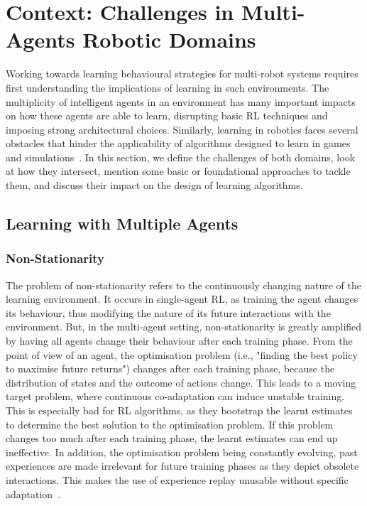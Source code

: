 
\section{Context: Challenges in Multi-Agents Robotic Domains}\label{sec:MADRL_Context}

Working towards learning behavioural strategies for multi-robot systems requires first understanding the implications of learning in such environments. The multiplicity of intelligent agents in an environment has many important impacts on how these agents are able to learn, disrupting basic RL techniques and imposing strong architectural choices. Similarly, learning in robotics faces several obstacles that hinder the applicability of algorithms designed to learn in games and simulations~\citep{Pierson2017_DRLinRobots}. In this section, we define the challenges of both domains, look at how they intersect, mention some basic or foundational approaches to tackle them, and discuss their impact on the design of learning algorithms. 



\subsection{Learning with Multiple Agents}\label{sec:MAL_issues}

\subsubsection{Non-Stationarity}\label{sec:MAS:NonStation}

The problem of non-stationarity refers to the continuously changing nature of the learning environment. It occurs in single-agent RL, as training the agent changes its behaviour, thus modifying the nature of its future interactions with the environment. But, in the multi-agent setting, non-stationarity is greatly amplified by having all agents change their behaviour after each training phase. 
From the point of view of an agent, the optimisation problem (i.e., "finding the best policy to maximise future returns") changes after each training phase, because the distribution of states and the outcome of actions change. 
This leads to a moving target problem, where continuous co-adaptation can induce unstable training. 
This is especially bad for RL algorithms, as they bootstrap the learnt estimates to determine the best solution to the optimisation problem. If this problem changes too much after each training phase, the learnt estimates can end up ineffective. 
In addition, the optimisation problem being constantly evolving, past experiences are made irrelevant for future training phases as they depict obsolete interactions. This makes the use of experience replay unusable without specific adaptation~\citep{Foerster2016_SolveRiddles}. 


